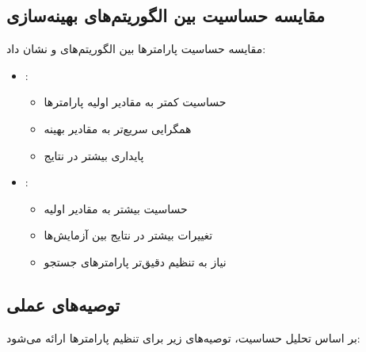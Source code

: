 \subsection{مقایسه حساسیت بین الگوریتم‌های بهینه‌سازی}
مقایسه حساسیت پارامترها بین الگوریتم‌های  و  نشان داد:

\begin{itemize}
    \renewcommand{\labelitemi}{\lr{$\bullet$}}
    \item \textbf{}: 
    \begin{itemize}
        \renewcommand{\labelitemii}{\lr{$\bullet$}}
        \item حساسیت کمتر به مقادیر اولیه پارامترها
        \item همگرایی سریع‌تر به مقادیر بهینه
        \item پایداری بیشتر در نتایج
    \end{itemize}
    
    \item \textbf{}:
    \begin{itemize}
        \renewcommand{\labelitemii}{\lr{$\bullet$}}
        \item حساسیت بیشتر به مقادیر اولیه
        \item تغییرات بیشتر در نتایج بین آزمایش‌ها
        \item نیاز به تنظیم دقیق‌تر پارامترهای جستجو
    \end{itemize}
\end{itemize}

\subsection{توصیه‌های عملی}
بر اساس تحلیل حساسیت، توصیه‌های زیر برای تنظیم پارامترها ارائه می‌شود:

